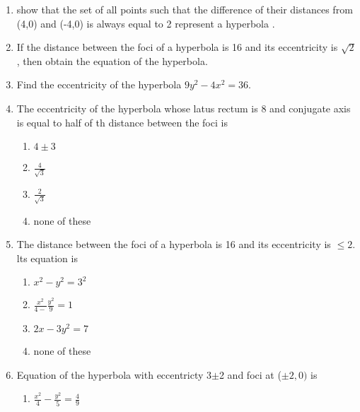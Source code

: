 \begin{enumerate}[label=\thesection.\arabic*,ref=\thesection.\theenumi,resume*]
\item show that the set of all points such that the difference of their distances from (4,0) and (-4,0) is always equal to 2 represent a hyperbola .
\item If the distance between the foci of a hyperbola is 16 and its eccentricity is $\sqrt{2}$, then obtain the equation of the hyperbola.
\item Find the eccentricity of the hyperbola $9y^2-4x^2=36$.
\item The eccentricity of the hyperbola whose latus rectum is 8 and conjugate axis is equal to half of th distance between the foci is 
\begin{enumerate}
\item $4\pm3$
\item $\frac{4}{\sqrt{3}}$
\item $\frac{2}{\sqrt{3}}$
\item none of these
\end{enumerate}
\item The distance between the foci of a hyperbola is 16 and its eccentricity is $\le{2}$. lts equation is
\begin{enumerate}
\item $x^2-y^2=3^2$
\item $\frac{x^2}{4-}\frac{y^2}{9}=1$
\item $2x-3y^2=7$
 \item none of these
 \end{enumerate}
 \item Equation of the hyperbola with eccentricty 3$\pm$2 and foci at ($\pm2,0)$ is
\begin{enumerate} 
	\item $\frac{x^2}{4}-\frac{y^2}{5}=\frac{4}{9}$


\end{enumerate}
\end{enumerate}
